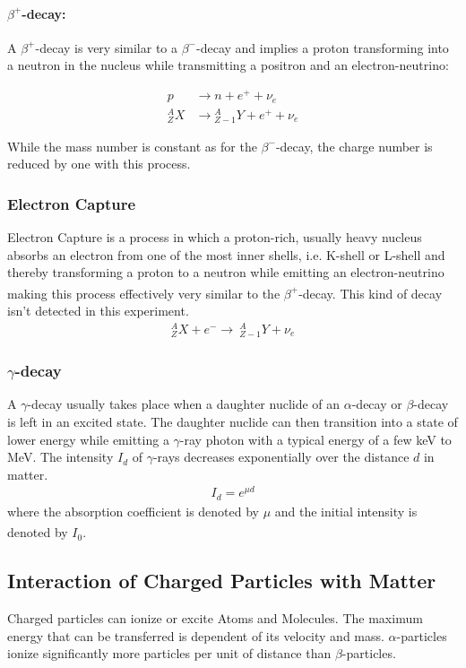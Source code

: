 \documentclass[12pt]{article}
\begin{document}
\paragraph*{$\beta^+$-decay:}
A $\beta^+$-decay is very similar to a $\beta^-$-decay and implies a proton transforming into a neutron in the nucleus while transmitting a positron and an electron-neutrino:

\begin{align*}
p &\rightarrow n + e^+ + \nu_e\\
{}_Z^A X &\rightarrow {}_{Z-1}^A Y + e^+ + \nu_e
\end{align*}

While the mass number is constant as for the $\beta^-$-decay, the charge number is reduced by one with this process.

\subsubsection{Electron  Capture}
Electron Capture is a process in which a proton-rich, usually heavy nucleus 
absorbs an electron from one of the most inner shells, i.e. K-shell or L-shell and thereby transforming a proton to a neutron while emitting an electron-neutrino making this process effectively very similar to the $\beta^+$-decay. \textsuperscript{\cite{dem}}
This kind of decay isn't detected in this experiment.
\begin{align}
{}_Z^A X + e^- \rightarrow\ {}_{Z-1}^A Y + \nu_e
\end{align}



\subsubsection{$\gamma$-decay}
A $\gamma$-decay usually takes place when a daughter nuclide of an $\alpha$-decay or $\beta$-decay is left in an excited state. The daughter nuclide can then transition into a state of lower energy while emitting a $\gamma$-ray photon with a typical energy of a few keV to MeV.
The intensity $I_d$ of $\gamma$-rays decreases exponentially over the distance $d$ in matter.
\begin{align}
I_d=e^{\mu d}
\end{align}
where the absorption coefficient is denoted by $\mu$ and the initial intensity is denoted by $I_0$.\textsuperscript{\cite{dem}}






\subsection{Interaction of Charged Particles with Matter}
Charged particles can ionize or excite Atoms and Molecules. The maximum energy that can be transferred is dependent of its velocity and mass.
$\alpha$-particles ionize significantly more particles per unit of distance than $\beta$-particles.
\end{document}
